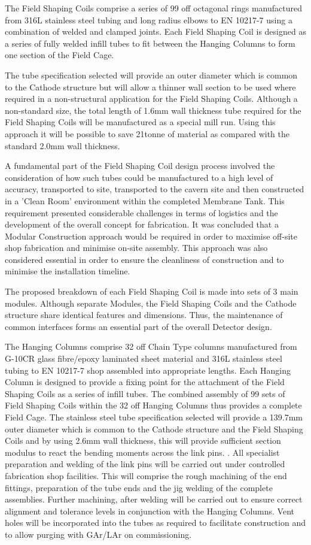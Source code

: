 The Field Shaping Coils comprise a series of 99 off octagonal rings manufactured from 316L stainless steel tubing and long radius elbows to EN 10217-7 using a combination of welded and clamped joints.  Each Field Shaping Coil is designed as a series of fully welded infill tubes to fit between the Hanging Columns to form one section of the Field Cage.

The tube specification selected will provide an outer diameter which is common to the Cathode structure but will allow a thinner wall section to be used where required in a non-structural application for the Field Shaping Coils.  Although a non-standard size, the total length of 1.6mm wall thickness tube required for the Field Shaping Coils will be manufactured as a special mill run.  Using this approach it will be possible to save 21tonne of material as compared with the standard 2.0mm wall thickness.

A fundamental part of the Field Shaping Coil design process involved the consideration of how such tubes could be manufactured to a high level of accuracy, transported to site, transported to the cavern site and then constructed in a 'Clean Room' environment within the completed Membrane Tank.  This requirement presented considerable challenges in terms of logistics and the development of the overall concept for fabrication.  It was concluded that a Modular Construction approach would be required in order to maximise off-site shop fabrication and minimise on-site assembly.  This approach was also considered essential in order to ensure the cleanliness of construction and to minimise the installation timeline.

The proposed breakdown of each Field Shaping Coil is made into sets of 3 main modules.   Although separate Modules, the Field Shaping Coils and the Cathode structure share identical features and dimensions.  Thus, the maintenance of common interfaces forms an essential part of the overall Detector design.

The Hanging Columns comprise 32 off  Chain Type columns manufactured from G-10CR glass fibre/epoxy laminated sheet material and 316L stainless steel tubing to EN 10217-7 shop assembled into appropriate lengths.  Each Hanging Column is designed to provide a fixing point for the attachment of the Field Shaping Coils as a series of infill tubes.  The combined assembly of 99 sets of Field Shaping Coils within the 32 off Hanging Columns thus provides a complete Field Cage.
The stainless steel tube specification selected will provide a 139.7mm outer diameter which is common to the Cathode structure and the Field Shaping Coils and by using 2.6mm wall thickness, this will provide sufficient section modulus to react the bending moments across the link pins. .  All specialist preparation and welding of the link pins will be carried out under controlled fabrication shop facilities.  This will comprise the rough machining of the end fittings, preparation of the tube ends and the jig welding of the complete assemblies. Further machining, after welding will be carried out to ensure correct alignment and tolerance levels in conjunction with the Hanging Columns.  Vent holes will be incorporated into the tubes as required to facilitate construction and to allow purging with GAr/LAr on commissioning.

